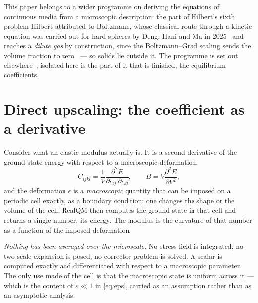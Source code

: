 \documentclass[11pt]{article}
\begin{document}
This paper belongs to a wider programme on deriving the equations of continuous media from a
microscopic description: the part of Hilbert's sixth problem Hilbert attributed to Boltzmann, whose
classical route through a kinetic equation was carried out for hard spheres by Deng, Hani and Ma in
2025~\cite{DHM2025} and reaches a \emph{dilute gas} by construction, since the Boltzmann--Grad
scaling sends the volume fraction to zero~\cite{Comment2025} --- so solids lie outside it. The
programme is set out elsewhere~\cite{hilbert6}; isolated here is the part of it that is finished,
the equilibrium coefficients.

\section{Direct upscaling: the coefficient as a derivative}\label{sec:direct}

Consider what an elastic modulus actually is. It is a second derivative of the ground-state energy
with respect to a macroscopic deformation,
\begin{equation}\label{eq:modulus}
C_{ijkl}=\frac{1}{V}\frac{\partial^2 E}{\partial\epsilon_{ij}\,\partial\epsilon_{kl}},
\qquad
B = V\frac{\partial^2 E}{\partial V^2} ,
\end{equation}
and the deformation $\epsilon$ is a \emph{macroscopic} quantity that can be imposed on a periodic
cell exactly, as a boundary condition: one changes the shape or the volume of the cell. RealQM then
computes the ground state in that cell and returns a single number, its energy. The modulus is the
curvature of that number as a function of the imposed deformation.

\emph{Nothing has been averaged over the microscale.} No stress field is integrated, no two-scale
expansion is posed, no corrector problem is solved. A scalar is computed exactly and differentiated
with respect to a macroscopic parameter. The only use made of the cell is that the macroscopic state
is uniform across it --- which is the content of $\varepsilon\ll1$ in \eqref{eq:eps}, carried as an
assumption rather than as an asymptotic analysis.
\end{document}
